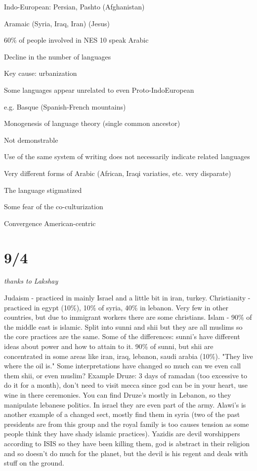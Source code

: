 \documentclass[12pt]{article}
\begin{document}
Indo-European: Persian, Pashto (Afghanistan)

Aramaic (Syria, Iraq, Iran) (Jesus)

60\% of people involved in NES 10 speak Arabic

\noindent
Decline in the number of languages

Key cause: urbanization

\noindent
Some languages appear unrelated to even Proto-IndoEuropean

e.g. Basque (Spanish-French mountains)

\noindent
Monogenesis of language theory (single common ancestor)

Not demonstrable

\noindent
Use of the same system of writing does not necessarily indicate related languages

\noindent
Very different forms of Arabic (African, Iraqi variaties, etc. very disparate)

The language stigmatized

\noindent
Some fear of the co-culturization

Convergence American-centric

\section{9/4}

\textit{thanks to Lakshay}

Judaism - practiced in mainly Israel and a little bit in iran, turkey. 
Christianity - practiced in egypt (10\%), 10\% of syria, 40\% in lebanon. Very few in other countries, but due to immigrant workers there are some christians. 
Islam - 90\% of the middle east is islamic. Split into sunni and shii but they are all muslims so the core practices are the same. Some of the differences: sunni's have different ideas about power and how to attain to it. 90\% of sunni, but shii are concentrated in some areas like iran, iraq, lebanon, saudi arabia (10\%). "They live where the oil is." Some interpretations have changed so much can we even call them shii, or even muslim? Example Druze: 3 days of ramadan (too excessive to do it for a month), don't need to visit mecca since god can be in your heart, use wine in there ceremonies. You can find Druze's mostly in Lebanon, so they manipulate lebanese politics. In israel they are even part of the army. Alawi's is another example of a changed sect, mostly find them in syria (two of the past presidents are from this group and the royal family is too causes tension as some people think they have shady islamic practices).  Yazidis are devil worshippers according to ISIS so they have been killing them, god is abstract in their religion and so doesn't do much for the planet, but the devil is his regent and deals with stuff on the ground. 
\end{document}

